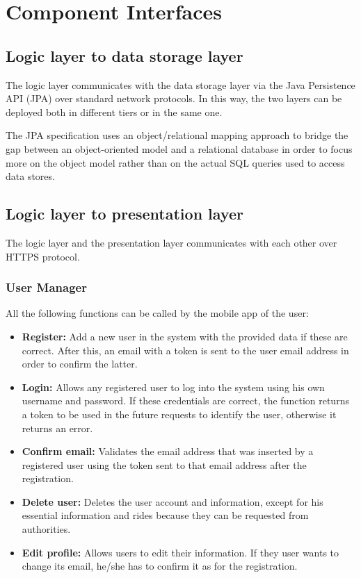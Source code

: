 \section{Component Interfaces}

\subsection{Logic layer to data storage layer}
The logic layer communicates with the data storage layer via the Java Persistence API (JPA) over standard network protocols.
In this way, the two layers can be deployed both in different tiers or in the same one.

The JPA specification uses an object/relational mapping approach to bridge the gap between an object-oriented model and a relational database in order to focus more on the object model rather than on the actual SQL queries used to access data stores.

\subsection{Logic layer to presentation layer}

The logic layer and the presentation layer communicates with each other over HTTPS protocol. %

\subsubsection{User Manager}
All the following functions can be called by the mobile app of the user:
\begin{itemize}
	\item \textbf{Register:} Add a new user in the system with the provided data if these are correct.
	After this, an email with a token is sent to the user email address in order to confirm the latter.
    \item \textbf{Login:} Allows any registered user to log into the system using his own username and password.
    If these credentials are correct, the function returns a token to be used in the future requests to identify the user, otherwise it returns an error.
    \item \textbf{Confirm email:} Validates the email address that was inserted by a registered user using the token sent to that email address after the registration.
    \item \textbf{Delete user:} Deletes the user account and information, except for his essential information and rides because they can be requested from authorities.
	\item \textbf{Edit profile:} Allows users to edit their information. If they user wants to change its email, he/she has to confirm it as for the registration.
\end{itemize}

